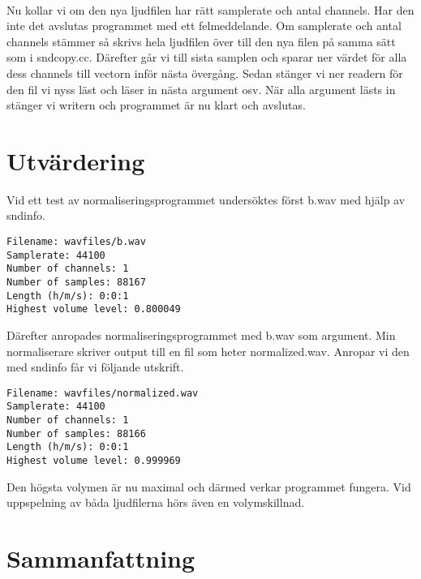 \documentclass[a4paper, 11pt]{article}
\begin{document}
\\[\baselineskip]
Nu kollar vi om den nya ljudfilen har rätt samplerate och antal channels. Har den inte det avslutas programmet med ett felmeddelande. Om samplerate och antal channels stämmer så skrivs hela ljudfilen över till den nya filen på samma sätt som i sndcopy.cc. Därefter går vi till sista samplen och sparar ner värdet för alla dess channels till vectorn inför nästa övergång. Sedan stänger vi ner readern för den fil vi nyss läst och läser in nästa argument osv. När alla argument lästs in stänger vi writern och programmet är nu klart och avslutas.

\section{Utvärdering}

Vid ett test av normaliseringsprogrammet undersöktes först b.wav med hjälp av sndinfo.
\begin{verbatim}
Filename: wavfiles/b.wav
Samplerate: 44100
Number of channels: 1
Number of samples: 88167
Length (h/m/s): 0:0:1
Highest volume level: 0.800049
\end{verbatim}
Därefter anropades normaliseringsprogrammet med b.wav som argument. Min normaliserare skriver output till en fil som heter normalized.wav. Anropar vi den med sndinfo får vi följande utskrift.
\begin{verbatim}
Filename: wavfiles/normalized.wav
Samplerate: 44100
Number of channels: 1
Number of samples: 88166
Length (h/m/s): 0:0:1
Highest volume level: 0.999969
\end{verbatim}
Den högsta volymen är nu maximal och därmed verkar programmet fungera. Vid uppspelning av båda ljudfilerna hörs även en volymskillnad.

\section{Sammanfattning}
\end{document}

